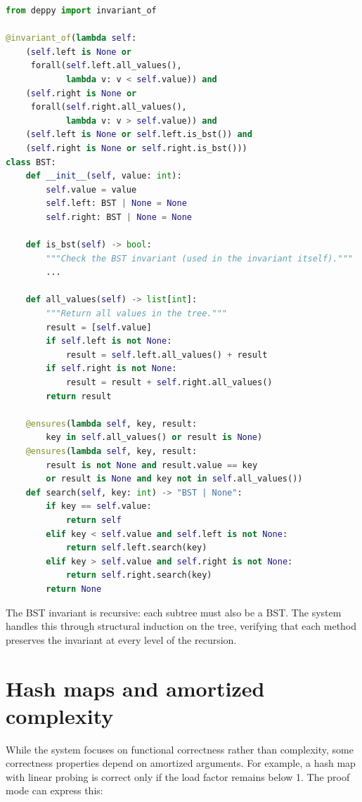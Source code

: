 \documentclass[11pt]{report}
\theoremstyle{definition}
\theoremstyle{plain}
\begin{document}
\begin{lstlisting}[style=deppy,language=Python]
from deppy import invariant_of

@invariant_of(lambda self:
    (self.left is None or
     forall(self.left.all_values(),
            lambda v: v < self.value)) and
    (self.right is None or
     forall(self.right.all_values(),
            lambda v: v > self.value)) and
    (self.left is None or self.left.is_bst()) and
    (self.right is None or self.right.is_bst()))
class BST:
    def __init__(self, value: int):
        self.value = value
        self.left: BST | None = None
        self.right: BST | None = None

    def is_bst(self) -> bool:
        """Check the BST invariant (used in the invariant itself)."""
        ...

    def all_values(self) -> list[int]:
        """Return all values in the tree."""
        result = [self.value]
        if self.left is not None:
            result = self.left.all_values() + result
        if self.right is not None:
            result = result + self.right.all_values()
        return result

    @ensures(lambda self, key, result:
        key in self.all_values() or result is None)
    @ensures(lambda self, key, result:
        result is not None and result.value == key
        or result is None and key not in self.all_values())
    def search(self, key: int) -> "BST | None":
        if key == self.value:
            return self
        elif key < self.value and self.left is not None:
            return self.left.search(key)
        elif key > self.value and self.right is not None:
            return self.right.search(key)
        return None
\end{lstlisting}

The BST invariant is recursive: each subtree must also be a BST. The system
handles this through structural induction on the tree, verifying that each
method preserves the invariant at every level of the recursion.

\section{Hash maps and amortized complexity}

While the system focuses on functional correctness rather than complexity,
some correctness properties depend on amortized arguments. For example, a
hash map with linear probing is correct only if the load factor remains
below 1. The proof mode can express this:
\end{document}
